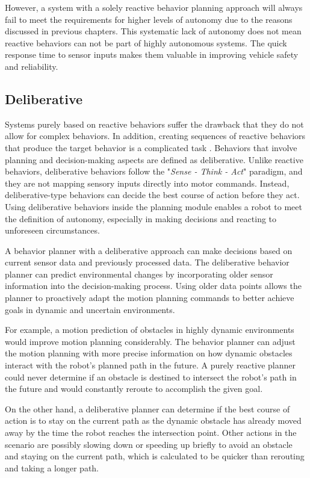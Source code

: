However, a system with a solely reactive behavior planning approach will always fail to meet the requirements for higher levels of autonomy due to the reasons discussed in previous chapters. This systematic lack of autonomy does not mean reactive behaviors can not be part of highly autonomous systems. The quick response time to sensor inputs makes them valuable in improving vehicle safety and reliability. 

\subsection{Deliberative}

Systems purely based on reactive behaviors suffer the drawback that they do not allow for complex behaviors. In addition, creating sequences of reactive behaviors that produce the target behavior is a complicated task \cite{murphy2000}. Behaviors that involve planning and decision-making aspects are defined as deliberative. Unlike reactive behaviors, deliberative behaviors follow the "\textit{Sense - Think - Act}" paradigm, and they are not mapping sensory inputs directly into motor commands. Instead, deliberative-type behaviors can decide the best course of action before they act. Using deliberative behaviors inside the planning module enables a robot to meet the definition of autonomy, especially in making decisions and reacting to unforeseen circumstances. 

A behavior planner with a deliberative approach can make decisions based on current sensor data and previously processed data. The deliberative behavior planner can predict environmental changes by incorporating older sensor information into the decision-making process. Using older data points allows the planner to proactively adapt the motion planning commands to better achieve goals in dynamic and uncertain environments. 

For example, a motion prediction of obstacles in highly dynamic environments would improve motion planning considerably. The behavior planner can adjust the motion planning with more precise information on how dynamic obstacles interact with the robot's planned path in the future. A purely reactive planner could never determine if an obstacle is destined to intersect the robot's path in the future and would constantly reroute to accomplish the given goal.

On the other hand, a deliberative planner can determine if the best course of action is to stay on the current path as the dynamic obstacle has already moved away by the time the robot reaches the intersection point. Other actions in the scenario are possibly slowing down or speeding up briefly to avoid an obstacle and staying on the current path, which is calculated to be quicker than rerouting and taking a longer path. 


